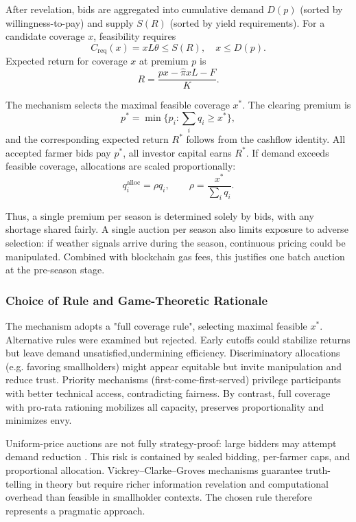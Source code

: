 \documentclass[11pt,a4paper]{article}
\begin{document}
After revelation, bids are aggregated into cumulative demand $D(p)$ (sorted by willingness-to-pay) and supply $S(R)$ (sorted by yield requirements). For a candidate coverage $x$, feasibility requires
\[
C_{\mathrm{req}}(x) = xL\theta \leq S(R), \quad x \leq D(p).
\]
Expected return for coverage $x$ at premium $p$ is
\[
R = \frac{px - \hat{\pi}xL - F}{K}.
\]

The mechanism selects the maximal feasible coverage $x^\ast$. The clearing premium is
\[
p^\ast = \min\{p_i : \sum_i q_i \geq x^\ast\},
\]
and the corresponding expected return $R^\ast$ follows from the cashflow identity. All accepted farmer bids pay $p^\ast$, all investor capital earns $R^\ast$. If demand exceeds feasible coverage, allocations are scaled proportionally:
\[
q_i^{\text{alloc}} = \rho q_i, \qquad \rho = \frac{x^\ast}{\sum_i q_i}.
\]

Thus, a single premium per season is determined solely by bids, with any shortage shared fairly. A single auction per season also limits exposure to adverse selection: if weather signals arrive during the season, continuous pricing could be manipulated. Combined with blockchain gas fees, this justifies one batch auction at the pre-season stage.  

\subsubsection{Choice of Rule and Game-Theoretic Rationale}

The mechanism adopts a "full coverage rule", selecting maximal feasible $x^\ast$. Alternative rules were examined but rejected. Early cutoffs could stabilize returns but leave demand unsatisfied,undermining efficiency. Discriminatory allocations (e.g. favoring smallholders) might appear equitable but invite manipulation and reduce trust. Priority mechanisms (first-come-first-served) privilege participants with better technical access, contradicting fairness. By contrast, full coverage with pro-rata rationing mobilizes all capacity, preserves proportionality and minimizes envy.  

Uniform-price auctions are not fully strategy-proof: large bidders may attempt demand reduction \citep{wilson1979auctions,ausubel2002demand}. This risk is contained by sealed bidding, per-farmer caps, and proportional allocation. Vickrey--Clarke--Groves mechanisms \citep{vickrey1961counterspeculation,groves1973incentives} guarantee truth-telling in theory but require richer information revelation and computational overhead than feasible in smallholder contexts. The chosen rule therefore represents a pragmatic approach. 
\end{document}
